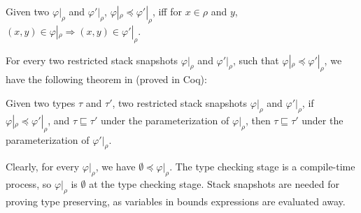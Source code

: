 \begin{defi}
  Given two $\varphi|_{\rho}$ and $\varphi'|_{\rho}$,
  $\varphi|_{\rho} \preceq \varphi'|_{\rho}$, iff for $x\in\rho$ and
  $y$,
  $(x,y) \in \varphi|_{\rho} \Rightarrow (x,y) \in \varphi'|_{\rho}$.
\end{defi}

For every two restricted stack snapshots $\varphi|_{\rho}$ and
$\varphi'|_{\rho}$, such that
$\varphi|_{\rho} \preceq \varphi'|_{\rho}$, we have the following
theorem in \checkedc (proved in Coq):

\begin{thm}
  Given two types $\tau$ and $\tau'$, two restricted stack snapshots
  $\varphi|_{\rho}$ and $\varphi'|_{\rho}$, if
  $\varphi|_{\rho}\preceq \varphi'|_{\rho}$, and
  $\tau \sqsubseteq \tau'$ under the parameterization of
  $\varphi|_{\rho}$, then $\tau \sqsubseteq \tau'$ under the
  parameterization of $\varphi'|_{\rho}$.
\end{thm}

Clearly, for every $\varphi|_{\rho}$, we have
$\emptyset \preceq \varphi|_{\rho}$. The type checking stage is a
compile-time process, so $\varphi|_{\rho}$
is $\emptyset$ at the type checking stage. Stack snapshots are needed
for proving type preserving, as variables in bounds expressions are
evaluated away.


